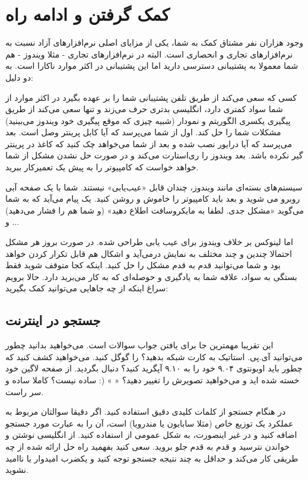 \section{کمک گرفتن و ادامه راه}
وجود هزاران نفر مشتاق کمک به شما، یکی از مزایای اصلی نرم‌افزارهای آزاد نسبت به نرم‌افزارهای تجاری و انحصاری است. البته در نرم‌افزارهای تجاری - مثلا ویندوز - هم شما معمولا به پشتیبانی دسترسی دارید اما این پشتیبانی در اکثر موارد ناکارا است. به دو دلیل:

کسی که سعی می‌کند از طریق تلفن پشتیبانی شما را بر عهده بگیرد در اکثر موارد از شما سواد کمتری دارد، انگلیسی بدتری حرف می‌زند و تنها سعی می‌کند از طریق پیگیری یکسری الگوریتم و نمودار (شبیه چیزی که موقع پیگیری 
 خود ویندوز می‌بینید) مشکلات شما را حل کند. اول از شما می‌پرسد که آیا کابل پرینتر وصل است. بعد می‌پرسد که آیا درایور نصب شده و بعد از شما می‌خواهد چک کنید که کاغذ در پرینتر گیر نکرده باشد. بعد ویندوز را ری‌استارت می‌کند و در صورت حل نشدن مشکل از شما خواهد خواست که کامپیوتر را به پیش یک تعمیرکار ببرید.

سیستم‌های بسته‌ای مانند ویندوز، چندان قابل «عیب‌یابی» نیستند. شما با یک صفحه آبی روبرو می شوید و بعد باید کامپیوتر را خاموش و روشن کنید. یک پیام می‌آید که به شما می‌گوید «مشکل جدی. لطفا به مایکروسافت اطلاع دهید» (و شما هم 
را فشار می‌دهید) و ...

اما لینوکس بر خلاف ویندوز برای عیب یابی طراحی شده. در صورت بروز هر مشکل احتمالا چندین و چند 
مختلف به نمایش درمی‌آید و اشکال هم قابل تکرار کردن خواهد بود و شما می‌توانید قدم به قدم مشکل را حل کنید. اینکه کجا متوقف شوید فقط بستگی به سواد، علاقه شما به یادگیری و حوصله‌ای که به کار می‌برید دارد.
حالا برویم سراغ اینکه از چه جاهایی می‌توانید کمک بگیرید:
\subsection*{جستجو در اینترنت}
این تقریبا مهمترین جا برای یافتن جواب سوالات است. می‌خواهید بدانید چطور می‌توانید آی.پی. استاتیک به کارت شبکه بدهید؟ 
را گوگل کنید. می‌خواهید کشف کنید که چطور باید اوبونتوی ۹.۰۴ خود را به ۹.۱۰ آپگرید کنید؟ دنبال 
 بگردید. از صفحه لاگین خود خسته شده اید و می‌خواهید تصویرش را تغییر دهید؟ «
» (: ساده نیست؟ کاملا ساده و سر راست.

در هنگام جستجو از کلمات کلیدی دقیق استفاده کنید. اگر دقیقا سوالتان مربوط به عملکرد یک توزیع خاص (مثلا سابایون یا مندرویا) است، آن را به عبارت مورد جستجو اضافه کنید و در غیر اینصورت، به شکل عمومی از 
استفاده کنید. از انگلیسی نوشتن و خواندن نترسید و قدم به قدم جلو بروید. سعی کنید بفهمید راه حل ارائه شده از چه طریقی کار می‌کند و حداقل به چند نتیجه جستجو توجه کنید و یکضرب امیدوار یا ناامید نشوید.
